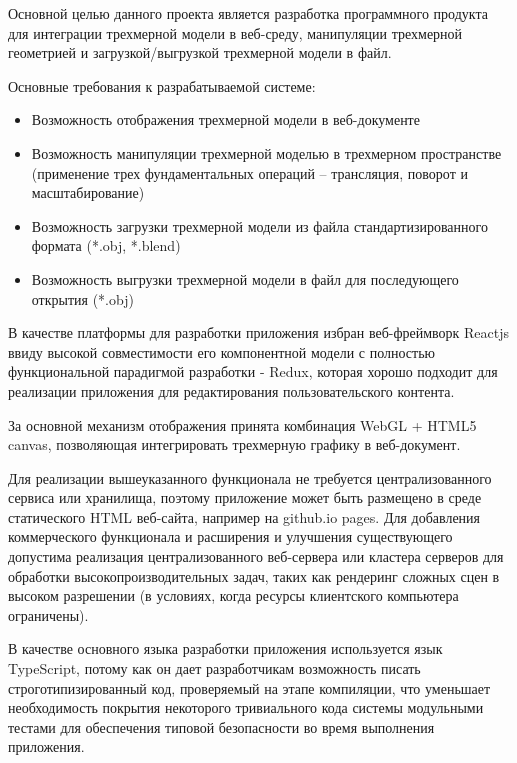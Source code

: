 Основной целью данного проекта является разработка программного продукта для интеграции трехмерной модели в веб-среду,
манипуляции трехмерной геометрией и загрузкой/выгрузкой трехмерной модели в файл.

Основные требования к разрабатываемой системе:
\begin{itemize}
\item Возможность отображения трехмерной модели в веб-документе
\item Возможность манипуляции трехмерной моделью в трехмерном пространстве (применение трех фундаментальных операций -- трансляция, поворот и масштабирование) 
\item Возможность загрузки трехмерной модели из файла стандартизированного формата (*.obj, *.blend)
\item Возможность выгрузки трехмерной модели в файл для последующего открытия (*.obj)
\end{itemize}

В качестве платформы для разработки
приложения избран веб-фреймворк Reactjs ввиду высокой совместимости его компонентной модели с полностью функциональной
парадигмой разработки - Redux, которая хорошо подходит для реализации приложения для редактирования пользовательского
контента.

За основной механизм отображения принята комбинация WebGL + HTML5 canvas, позволяющая интегрировать трехмерную графику в
веб-документ.

Для реализации вышеуказанного функционала не требуется централизованного сервиса или хранилища, поэтому приложение может быть
размещено в среде статического HTML веб-сайта, например на github.io pages. Для добавления коммерческого функционала и расширения и
улучшения существующего допустима реализация централизованного веб-сервера или кластера серверов для обработки высокопроизводительных
задач, таких как рендеринг сложных сцен в высоком разрешении (в условиях, когда ресурсы клиентского компьютера ограничены).

В качестве основного языка разработки приложения используется язык TypeScript, потому как он дает разработчикам возможность писать строготипизированный код,
проверяемый на этапе компиляции, что уменьшает необходимость покрытия некоторого тривиального кода системы модульными тестами для обеспечения типовой безопасности
во время выполнения приложения.